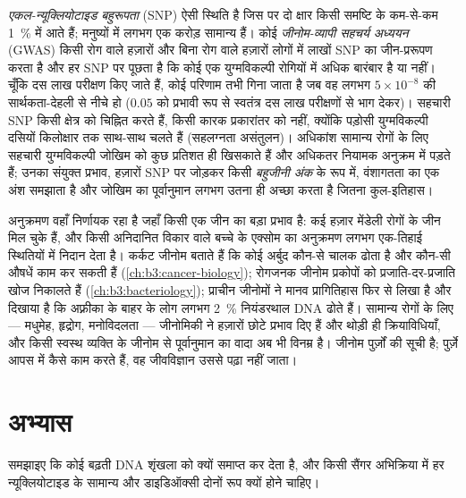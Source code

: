 \begin{definition}[जीनोम-व्यापी सहचर्य]\label{def:b3:genomics:gwas}
\emph{एकल-न्यूक्लियोटाइड बहुरूपता} (SNP) ऐसी स्थिति है जिस पर दो क्षार
किसी समष्टि के कम-से-कम \qty{1}{\%} में आते हैं; मनुष्यों में लगभग एक
करोड़ सामान्य हैं। कोई \emph{जीनोम-व्यापी सहचर्य अध्ययन} (GWAS) किसी
रोग वाले हज़ारों और बिना रोग वाले हज़ारों लोगों में लाखों SNP का
जीन-प्ररूपण करता है और हर SNP पर पूछता है कि कोई एक युग्मविकल्पी
रोगियों में अधिक बारंबार है या नहीं। चूँकि दस लाख परीक्षण किए जाते हैं,
कोई परिणाम तभी गिना जाता है जब वह लगभग $5\times 10^{-8}$ की
सार्थकता-देहली से नीचे हो ($0.05$ को प्रभावी रूप से स्वतंत्र दस लाख
परीक्षणों से भाग देकर)। सहचारी SNP किसी क्षेत्र को चिह्नित करते हैं,
किसी कारक प्रकारांतर को नहीं, क्योंकि पड़ोसी युग्मविकल्पी दसियों
किलोक्षार तक साथ-साथ चलते हैं (सहलग्नता असंतुलन)। अधिकांश सामान्य रोगों
के लिए सहचारी युग्मविकल्पी जोखिम को कुछ प्रतिशत ही खिसकाते हैं और
अधिकतर नियामक अनुक्रम में पड़ते हैं; उनका संयुक्त प्रभाव, हज़ारों SNP पर
जोड़कर किसी \emph{बहुजीनी अंक} के रूप में, वंशागतता का एक अंश समझाता है
और जोखिम का पूर्वानुमान लगभग उतना ही अच्छा करता है जितना कुल-इतिहास।
\end{definition}

\begin{remark}[जीनोमिकी ने क्या दिया और क्या नहीं]\label{rem:b3:genomics:delivered}
अनुक्रमण वहाँ निर्णायक रहा है जहाँ किसी एक जीन का बड़ा प्रभाव है: कई
हज़ार मेंडेली रोगों के जीन मिल चुके हैं, और किसी अनिदानित विकार वाले
बच्चे के एक्सोम का अनुक्रमण लगभग एक-तिहाई स्थितियों में निदान देता है।
कर्कट जीनोम बताते हैं कि कोई अर्बुद कौन-से चालक ढोता है और कौन-सी औषधें
काम कर सकती हैं (\cref{ch:b3:cancer-biology}); रोगजनक जीनोम प्रकोपों को
प्रजाति-दर-प्रजाति खोज निकालते हैं (\cref{ch:b3:bacteriology}); प्राचीन
जीनोमों ने मानव प्रागितिहास फिर से लिखा है और दिखाया है कि अफ़्रीका के
बाहर के लोग लगभग \qty{2}{\%} नियंडरथाल DNA ढोते हैं। सामान्य रोगों के
लिए --- मधुमेह, हृद्रोग, मनोविदलता --- जीनोमिकी ने हज़ारों छोटे प्रभाव
दिए हैं और थोड़ी ही क्रियाविधियाँ, और किसी स्वस्थ व्यक्ति के जीनोम से
पूर्वानुमान का वादा अब भी विनम्र है। जीनोम पुर्ज़ों की सूची है; पुर्ज़े
आपस में कैसे काम करते हैं, वह जीवविज्ञान उससे पढ़ा नहीं जाता।
\end{remark}

\section{अभ्यास}

\begin{exercise}[$\star$]\label{exo:b3:genomics:1}
समझाइए कि कोई  बढ़ती DNA शृंखला को क्यों समाप्त
कर देता है, और किसी सैंगर अभिक्रिया में हर न्यूक्लियोटाइड के सामान्य
और डाइडिऑक्सी दोनों रूप क्यों होने चाहिए।
\end{exercise}

